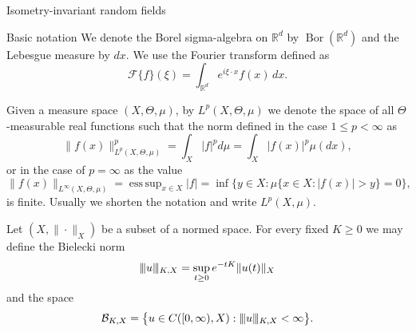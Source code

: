 \documentclass[a4paper,10pt,fleqn]{amsart}
\theoremstyle{remark}
\theoremstyle{definition}
\DeclareMathOperator{\Bor}{Bor}
\DeclareMathOperator*{\esssup}{ess\,sup}
\newcommand{\X} {{\mathbb{R}^d}}
\newcommand{\T} {[0,\infty)}
\newcommand{\FT}[1] {\mathcal{F}\big\{ #1 \big\}}
\renewcommand{\=} {\overset{d}{=}}
\newcommand{\viii} {|\kern-0.25ex|\kern-0.25ex|}
\newcommand{\K}[2] {\viii #1 \viii_{K,#2}}
\begin{document}
  \begin{section}{Isometry-invariant random fields}\label{preliminaries}
    \begin{subsection}{Basic notation}
      We denote the Borel sigma-algebra on $\X$ by $\Bor(\X)$ and the Lebesgue measure by $dx$.
      We use the Fourier transform defined as
      \begin{equation*}
        \FT{f}(\xi) = \int_\X e^{i\xi\cdot x}f(x)\,dx.
      \end{equation*}
      
      Given a measure space $(X,\Theta,\mu)$, by $L^p(X,\Theta,\mu)$ we denote the space of all $\Theta$-measurable real functions such that the norm defined in the case $1\leq p < \infty$ as
      \begin{equation*}
        \|f(x)\|_{L^p(X,\Theta,\mu)}^p = \int_X |f|^p d\mu = \int_X |f(x)|^p \mu(dx),
      \end{equation*}
      or in the case of $p=\infty$ as the value 
      \begin{equation*}
        \|f(x)\|_{L^\infty(X,\Theta,\mu)} = \esssup_{x\in X}|f| = \inf\big\{y\in X: \mu\{x\in X:|f(x)|>y\} = 0\big\},
      \end{equation*}
      is finite. Usually we shorten the notation and write $L^p(X,\mu)$.
      
      Let $(X,\|\cdot\|_X)$ be a subset of a normed space. For every fixed $K\geq0$ we may define the Bielecki norm
  \begin{equation}\label{bielecki}
      \K{u}{X} = \sup_{t\geq0}e^{-tK}\|u(t)\|_X
   \end{equation}
  and the space
  \begin{equation*}
   \mathcal{B}_{K,X} = \big\{u\in C(\T,X) : \K{u}{X} < \infty\big\}.
  \end{equation*}
      

\end{subsection}
\end{section}
\end{document}
